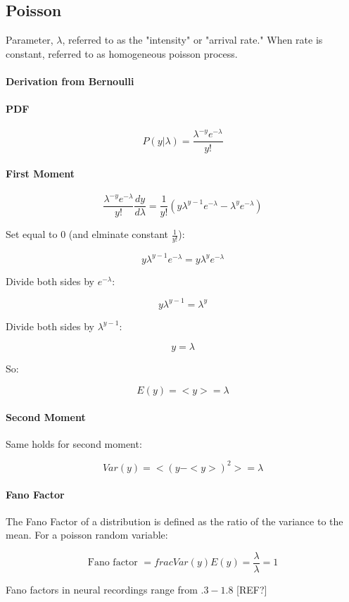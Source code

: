 \documentclass[../doc.tex]{subfiles}
\begin{document}
\subsection{Poisson}

Parameter, $\lambda$, referred to as the "intensity" or "arrival rate." When rate is constant, referred to as homogeneous poisson process.

\paragraph{Derivation from Bernoulli}

\paragraph{PDF}
\[
P(y | \lambda) = \frac{\lambda^{-y} e^{-\lambda}}{y!}
\]

\paragraph{First Moment}

\[
\frac{\lambda^{-y} e^{-\lambda}}{y!} \frac{dy}{d\lambda} = \frac{1}{y!}( y \lambda^{y-1}e^{-\lambda} - \lambda^{y} e^{-\lambda} )
\]

Set equal to 0 (and elminate constant $\frac{1}{y!}$):

\[
y \lambda^{y-1}e^{-\lambda} = y \lambda^{y}e^{-\lambda}
\]

Divide both sides by $e^{-\lambda}$:

\[
y \lambda^{y-1} = \lambda^{y}
\]

Divide both sides by $\lambda^{y-1}$:

\[
y = \lambda
\]

So:

\[
E(y) = <y> = \lambda
\]

\paragraph{Second Moment}

Same holds for second moment:

\[
Var(y) = < (y - <y>)^2 > = \lambda
\]

\paragraph{Fano Factor}

The Fano Factor of a distribution is defined as the ratio of the variance to the mean. For a poisson random variable:

\[
\text{Fano factor } = frac{Var(y)}{E(y)} =  \frac{\lambda}{\lambda} = 1
\]

Fano factors in neural recordings range from $.3 - 1.8$ [REF?]
\end{document}
